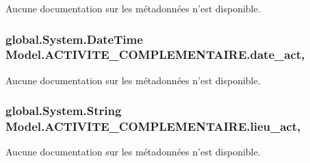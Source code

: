 Aucune documentation sur les métadonnées n'est disponible. 

\hypertarget{class_model_1_1_a_c_t_i_v_i_t_e___c_o_m_p_l_e_m_e_n_t_a_i_r_e_aacbeaa9cd3bfc61485c1ee7164d7a424}{
\subsubsection[{date\-\_\-act}]{\setlength{\rightskip}{0pt plus 5cm}global.\-System.\-Date\-Time Model.\-A\-C\-T\-I\-V\-I\-T\-E\-\_\-\-C\-O\-M\-P\-L\-E\-M\-E\-N\-T\-A\-I\-R\-E.\-date\-\_\-act\hspace{0.3cm}{\ttfamily [get]}, {\ttfamily [set]}}}\label{class_model_1_1_a_c_t_i_v_i_t_e___c_o_m_p_l_e_m_e_n_t_a_i_r_e_aacbeaa9cd3bfc61485c1ee7164d7a424}


Aucune documentation sur les métadonnées n'est disponible. 

\hypertarget{class_model_1_1_a_c_t_i_v_i_t_e___c_o_m_p_l_e_m_e_n_t_a_i_r_e_a730e1eac8f9fafbb0f48672688609f5e}{
\subsubsection[{lieu\-\_\-act}]{\setlength{\rightskip}{0pt plus 5cm}global.\-System.\-String Model.\-A\-C\-T\-I\-V\-I\-T\-E\-\_\-\-C\-O\-M\-P\-L\-E\-M\-E\-N\-T\-A\-I\-R\-E.\-lieu\-\_\-act\hspace{0.3cm}{\ttfamily [get]}, {\ttfamily [set]}}}\label{class_model_1_1_a_c_t_i_v_i_t_e___c_o_m_p_l_e_m_e_n_t_a_i_r_e_a730e1eac8f9fafbb0f48672688609f5e}


Aucune documentation sur les métadonnées n'est disponible. 


